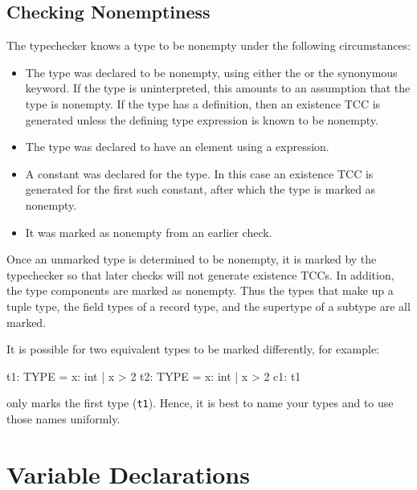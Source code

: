 \subsection{Checking Nonemptiness}\label{nonemptiness-check}
The typechecker knows a type to be nonempty under the
following circumstances:
\begin{itemize}

\item The type was declared to be nonempty, using either the
 or
the synonymous  keyword.  If the
type is uninterpreted, this amounts to an assumption that the type is
nonempty.  If the type has a definition, then an existence TCC is
generated unless the defining type expression is known to be nonempty.

\item The type was declared to have an element using a
 expression.

\item A constant was declared for the type.  In this case an existence TCC
is generated for the first such constant, after which the type is marked
as nonempty.

\item It was marked as nonempty from an earlier check.

\end{itemize}

Once an unmarked type is determined to be nonempty, it is marked by the
typechecker so that later checks will not generate existence TCCs.  In
addition, the type components are marked as nonempty.  Thus the types that
make up a tuple type, the field types of a record type, and the supertype
of a subtype are all marked.

It is possible for two equivalent types to be marked differently, for
example:
\begin{pvsex}
  t1: TYPE = \setb{}x: int | x > 2\sete
  t2: TYPE = \setb{}x: int | x > 2\sete
  c1: t1
\end{pvsex}
only marks the first type (\texttt{t1}).  Hence, it is best to name your types and
to use those names uniformly.


\section{Variable Declarations}

